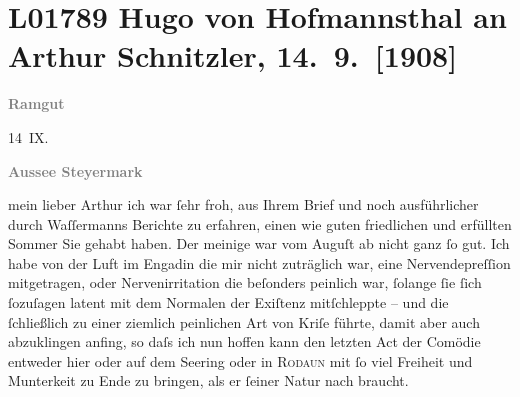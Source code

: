 

\section[Hugo von Hofmannsthal an Arthur Schnitzler, 14. 9. {[}1908{]}]{L01789 Hugo von Hofmannsthal an Arthur Schnitzler, 14. 9. {[}1908{]}}
\nopagebreak{}
\rehead{ }\normalsize\beginnumbering{}
\toendnotes[C]{\smallbreak\pagebreak[2]}
\toendnotes[C]{\smallbreak}
\pstart
           
\pstart
           {\pb}\textcolor{gray}{\textbf{Ramgut}}\pend
           
\pstart
           \raggedleft{}14 IX.\pend
           \pend
           
\pstart
           \textcolor{gray}{\textbf{Aussee Steyermark}}\pend
           
\pstart{}mein lieber Arthur\pend\vspace{0.5em}
\pstart
           ich war ſehr froh, aus Ihrem Brief und noch ausführlicher durch Waſſermanns Berichte zu erfahren, einen wie guten friedlichen
               und erfüllten Sommer Sie gehabt haben. Der meinige war vom Auguſt ab nicht ganz ſo
               gut. Ich habe von der Luft im Engadin die mir
               nicht zuträglich war, eine Nervendepreſſion {\pb}mitgetragen, oder Nervenirritation
               die beſonders peinlich war, ſolange ſie ſich ſozuſagen latent mit dem Normalen der
               Exiſtenz mitſchleppte – und die ſchließlich zu einer ziemlich peinlichen Art von
               Kriſe führte, damit aber auch abzuklingen anfing, so daſs ich nun hoffen kann den
               letzten Act der Comödie
               entweder hier oder auf dem Se{\geminationm}ering oder in \textsc{Rodaun} mit ſo viel Freiheit und Munterkeit zu Ende zu {\pb}bringen, als er ſeiner Natur nach
               braucht.\pend
           
